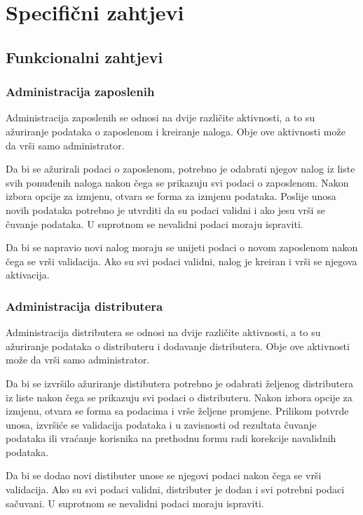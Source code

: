 \chapter{Specifični zahtjevi}
\label{poglavlje3}
\section{Funkcionalni zahtjevi}
\subsection{Administracija zaposlenih}
Administracija zaposlenih se odnosi na dvije različite aktivnosti, a to su ažuriranje podataka o 
zaposlenom i kreiranje naloga. Obje ove aktivnosti može da vrši samo administrator.

Da bi se ažurirali podaci o zaposlenom, potrebno je odabrati njegov nalog iz liste svih ponuđenih naloga nakon 
čega se prikazuju svi podaci o zaposlenom. Nakon izbora opcije za izmjenu, otvara se forma za izmjenu podataka. 
Poslije unosa novih podataka potrebno je utvrditi da su podaci validni i ako jesu vrši se čuvanje podataka. 
U suprotnom se nevalidni podaci moraju ispraviti. 

Da bi se napravio novi nalog moraju se unijeti podaci o novom zaposlenom nakon čega se vrši validacija. Ako su 
svi podaci validni, nalog je kreiran i vrši se njegova aktivacija.

\subsection{Administracija distributera}
Administracija distributera se odnosi na dvije različite aktivnosti, a to su ažuriranje podataka 
o distributeru i dodavanje distributera. Obje ove aktivnosti može da vrši samo administrator.
 
Da bi se izvršilo ažuriranje distibutera potrebno je odabrati željenog distributera iz liste nakon čega se prikazuju  svi
podaci o distributeru. Nakon izbora opcije za izmjenu, otvara se forma sa 
podacima i vrše željene promjene. Prilikom potvrde unosa, izvršiće se validacija podataka i u zavisnosti od rezultata 
čuvanje podataka ili vraćanje korisnika na prethodnu formu radi korekcije navalidnih podataka.

Da bi se dodao novi distibuter unose se njegovi podaci nakon čega se vrši validacija. Ako su svi podaci validni, 
distributer je dodan i svi potrebni podaci sačuvani. U suprotnom se nevalidni podaci moraju ispraviti. 

